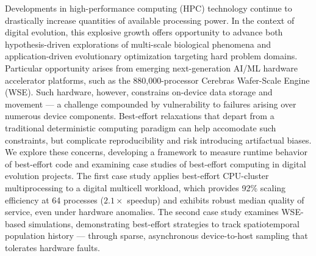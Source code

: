 {%
Developments in high-performance computing (HPC) technology continue to drastically increase quantities of available processing power.
In the context of digital evolution, this explosive growth offers opportunity to advance both hypothesis-driven explorations of multi-scale biological phenomena and application-driven evolutionary optimization targeting hard problem domains.
Particular opportunity arises from emerging next-generation AI/ML hardware accelerator platforms, such as the 880,000-processor Cerebras Wafer-Scale Engine (WSE).
Such hardware, however, constrains on-device data storage and movement --- a challenge compounded by vulnerability to failures arising over numerous device components.
Best-effort relaxations that depart from a traditional deterministic computing paradigm can help accomodate such constraints, but complicate reproducibility and risk introducing artifactual biases.
We explore these concerns, developing a framework to measure runtime behavior of best-effort code and examining case studies of best-effort computing in digital evolution projects.
The first case study applies best-effort CPU-cluster multiprocessing to a digital multicell workload, which provides 92\% scaling efficiency at 64 processes ($2.1\times$ speedup) and exhibits robust median quality of service, even under hardware anomalies.
The second case study examines WSE-based simulations, demonstrating best-effort strategies to track spatiotemporal population history --- through sparse, asynchronous device-to-host sampling that tolerates hardware faults.
}
